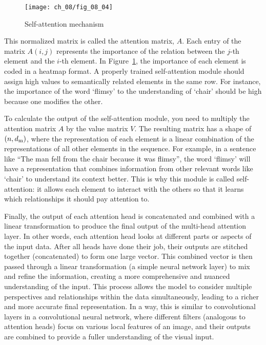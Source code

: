 \begin{figure}[H]
    \texttt{[image: ch\_08/fig\_08\_04]} %
    \caption{Self-attention mechanism}
    \label{fig:08:SA}
\end{figure}

This normalized matrix is called the attention matrix, $A$. Each entry of the matrix $A(i, j)$ represents the importance of the relation between the $j$-th element and  the $i$-th element.
In Figure~\ref{fig:08:SA}, the importance of each element is coded in a heatmap format. A properly trained self-attention module should assign high values to semantically related elements in the same row. For instance, the importance of the word `flimsy' to the understanding of `chair' should be high because one modifies the other. 

To calculate the output of the self-attention module, you need to multiply the attention matrix $A$ by the value matrix $V$. The resulting matrix has a shape of $(n, d_{\rm m})$, where the representation of each element is a linear combination of the representations of all other elements in the sequence. 
For example, in a sentence like ``The man fell from the chair because it was flimsy'', the word `flimsy' will have a representation that combines information from other relevant words like `chair' to understand its context better.
This is why this module is called self-attention:  it allows each element to interact with the others so that it learns which relationships it should pay attention to.

Finally, the output of each attention head is concatenated and combined with a linear transformation to produce the final output of the multi-head attention layer.
In other words, each attention head looks at different parts or aspects of the input data. After all heads have done their job, their outputs are stitched together (concatenated) to form one large vector. This combined vector is then passed through a linear transformation (a simple neural network layer) to mix and refine the information, creating a more comprehensive and nuanced understanding of the input. This process allows the model to consider multiple perspectives and relationships within the data simultaneously, leading to a richer and more accurate final representation.
In a way, this is similar to convolutional layers in a convolutional neural network, where different filters (analogous to attention heads) focus on various local features of an image, and their outputs are combined to provide a fuller understanding of the visual input.

